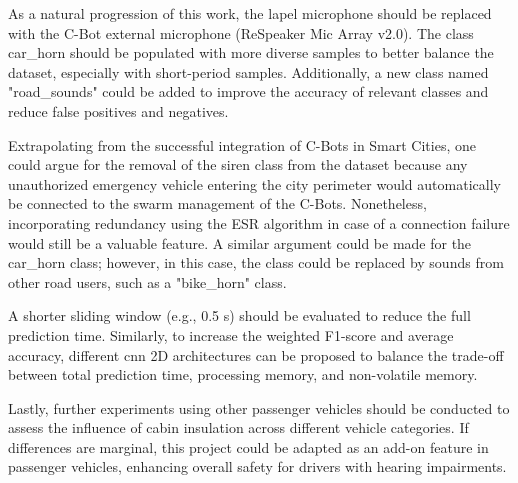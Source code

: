 As a natural progression of this work, the lapel microphone should be replaced with the C-Bot external microphone (ReSpeaker Mic Array v2.0). The class car\_horn should be populated with more diverse samples to better balance the dataset, especially with short-period samples. Additionally, a new class named "road\_sounds" could be added to improve the accuracy of relevant classes and reduce false positives and negatives. 

Extrapolating from the successful integration of C-Bots in Smart Cities, one could argue for the removal of the siren class from the dataset because any unauthorized emergency vehicle entering the city perimeter would automatically be connected to the swarm management of the C-Bots. Nonetheless, incorporating redundancy using the ESR algorithm in case of a connection failure would still be a valuable feature. A similar argument could be made for the car\_horn class; however, in this case, the class could be replaced by sounds from other road users, such as a "bike\_horn" class.

A shorter sliding window (e.g., 0.5 \gls{s}) should be evaluated to reduce the full prediction time. Similarly, to increase the weighted F1-score and average accuracy, different \gls{cnn} 2D architectures can be proposed to balance the trade-off between total prediction time, processing memory, and non-volatile memory.

Lastly, further experiments using other passenger vehicles should be conducted to assess the influence of cabin insulation across different vehicle categories. If differences are marginal, this project could be adapted as an add-on feature in passenger vehicles, enhancing overall safety for drivers with hearing impairments.